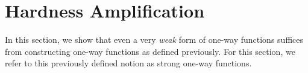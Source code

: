 %

%
%
%

%



\section{Hardness Amplification}
\label{sec:owf:amplify}
In this section, we show that even a very \emph{weak} form of one-way functions suffices from constructing one-way functions as defined previously. For this section, we refer to this previously defined notion as strong one-way functions.


